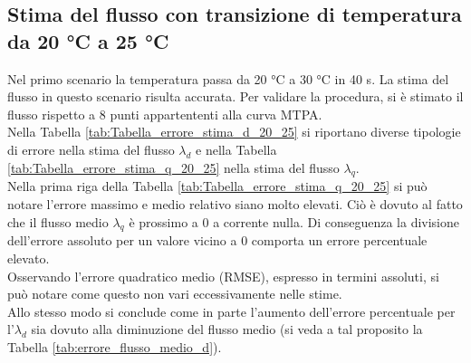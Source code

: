 \subsection{Stima del flusso con transizione di temperatura da 20 °C a 25 °C}
Nel primo scenario la temperatura passa da 20 °C a
30 °C in 40 s.
La stima del flusso in questo scenario risulta accurata. Per validare la procedura, si è stimato il flusso rispetto a 8 punti appartententi alla curva MTPA.\\
Nella Tabella \ref{tab:Tabella_errore_stima_d_20_25} si riportano diverse tipologie di errore nella stima del flusso $\lambda_d$ e nella Tabella \ref{tab:Tabella_errore_stima_q_20_25} nella stima del flusso $\lambda_q$.\\
Nella prima riga della Tabella \ref{tab:Tabella_errore_stima_q_20_25} si può notare l'errore massimo e medio relativo siano molto elevati. Ciò è dovuto al fatto che il flusso medio $\lambda_q$ è prossimo a 0 a corrente nulla. Di conseguenza la divisione dell'errore assoluto per un valore vicino a 0 comporta un errore percentuale elevato.\\ Osservando l'errore quadratico medio (RMSE), espresso in termini assoluti, si può notare come questo non vari eccessivamente nelle stime.\\
Allo stesso modo si conclude come in parte l'aumento dell'errore percentuale per l'$\lambda_d$ sia dovuto alla diminuzione del flusso medio (si veda a tal proposito la Tabella \ref{tab:errore_flusso_medio_d}).

